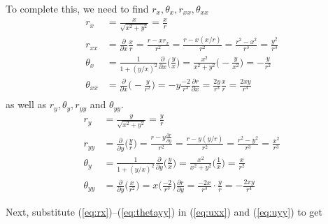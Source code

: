 To complete this, we need to find $r_x, \theta_x, r_{xx}, \theta_{xx}$
%
\begin{align}
r_x & = \frac{x}{\sqrt{x^2+y^2}} = \frac{x}{r} \label{eq:rx} \\
r_{xx} & = \frac{\partial }{\partial x} \frac{x}{r} = \frac{r -x r_x}{r^2}  = \frac{r-x(x/r)}{r^2} = \frac{r^2-x^2}{r^3} = \frac{y^2}{r^3}  \label{eq:rxx} \\
\theta_{x} & = \frac{1}{1+(y/x)^2} \frac{\partial }{\partial x} \biggl(\frac{y}{x}\biggr) = \frac{x^2}{x^2+y^2} \biggl( -\frac{y}{x^2} \biggr)  = -\frac{y}{r^2} \label{eq:thetax} \\
\theta_{xx} & = \frac{\partial }{\partial x} \biggl(  -\frac{y}{r^2} \biggr) = -y \frac{-2}{r^3} \frac{\partial r}{\partial x} =
\frac{2y}{r^3} \frac{x}{r} = \frac{2xy}{r^4}  \label{eq:thetaxx}\\
\end{align}
as well as $r_y, \theta_y, r_{yy}$ and $\theta_{yy}$.
%
\begin{align}
r_y & = \frac{y}{\sqrt{x^2+y^2}} = \frac{y}{r} \label{eq:ry} \\
r_{yy} & = \frac{\partial }{\partial y} \biggl( \frac{y}{r} \biggr) = \frac{r - y\frac{\partial r}{\partial y} }{r^2} =
\frac{r-y(y/r)}{r^2} = \frac{r^2-y^2}{r^3} = \frac{x^2}{r^3} \label{eq:ryy}  \\
\theta_y & = \frac{1}{1+(y/x)^2} \frac{\partial }{\partial y} \biggl(\frac{y}{x}\biggr) = \frac{x^2}{x^2+y^2} \biggl( \frac{1}{x} \biggr)  = \frac{x}{r^2} \label{eq:thetay} \\
\theta_{yy} & = \frac{\partial }{\partial y}\biggl( \frac{x}{r^2} \biggr) = x \biggl( \frac{-2}{r^3}\biggr) \frac{\partial r}{\partial y}  = \frac{-2x}{r^3} \cdot \frac{y}{r} = -\frac{2xy}{r^4}  \label{eq:thetayy}
\end{align}

Next, substitute (\ref{eq:rx})--(\ref{eq:thetayy}) in (\ref{eq:uxx}) and (\ref{eq:uyy}) to get

